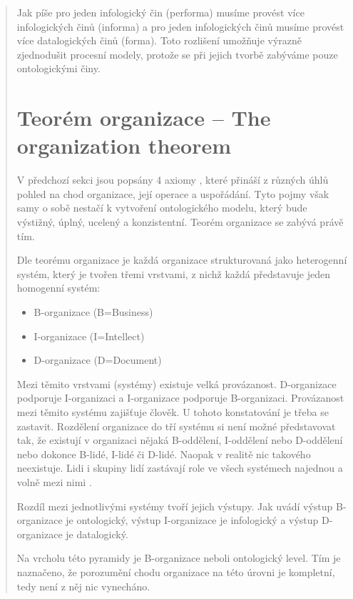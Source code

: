 \documentclass[]{article}
\begin{document}
\begin{quote}
Jak píše \cite{Vejrazkova2013} pro jeden infologický čin (performa) musíme provést více infologických činů (informa) a pro jeden infologických činů musíme provést více datalogických činů (forma). Toto rozlišení umožňuje výrazně zjednodušit procesní modely, protože se při jejich tvorbě zabýváme pouze ontologickými činy.

\section{Teorém organizace – The organization theorem}

V předchozí sekci jsou popsány 4 axiomy \psitheory, které přináší z různých úhlů pohled na chod organizace, její operace a uspořádání. Tyto pojmy však samy o sobě nestačí k vytvoření ontologického modelu, který bude výstižný, úplný, ucelený a konzistentní. Teorém organizace se zabývá právě tím.

Dle teorému organizace je každá organizace strukturovaná jako heterogenní systém, který je tvořen třemi vrstvami, z nichž každá představuje jeden homogenní systém: \cite{Dietz2006}

\begin{itemize}
\item B-organizace (B=Business)
\item I-organizace (I=Intellect)
\item D-organizace (D=Document)
\end{itemize}

Mezi těmito vrstvami (systémy) existuje velká provázanost. D-organizace podporuje I-organizaci a I-organizace podporuje B-organizaci. Provázanost mezi těmito systému zajišťuje člověk. U tohoto konstatování je třeba se zastavit. Rozdělení organizace do tří systému si není možné představovat tak, že existují v organizaci nějaká B-oddělení, I-oddělení nebo D-oddělení nebo dokonce B-lidé, I-lidé či D-lidé. Naopak v realitě nic takového neexistuje. Lidi i skupiny lidí zastávají role ve všech systémech najednou a volně mezi nimi .

Rozdíl mezi jednotlivými systémy tvoří jejich výstupy. Jak uvádí \cite{Dietz2006} výstup B-organizace je ontologický, výstup I-organizace je infologický a výstup D-organizace je datalogický.


Na vrcholu této pyramidy je B-organizace neboli ontologický level. Tím je naznačeno, že porozumění chodu organizace na této úrovni je kompletní, tedy není z něj nic vynecháno.


\end{quote}
\end{document}
